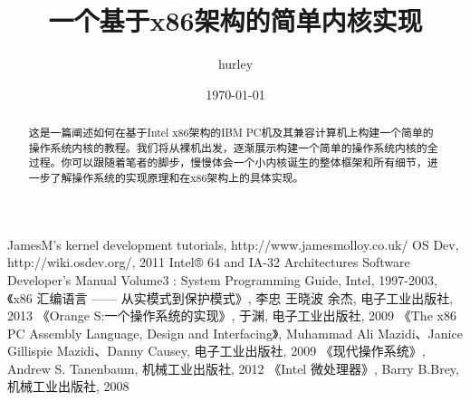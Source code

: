 \documentclass[11pt, a4paper]{article}
\title{一个基于x86架构的简单内核实现}
\author{hurley}
\date{\today}
\begin{document}
\maketitle

\begin{abstract}
这是一篇阐述如何在基于Intel x86架构的IBM PC机及其兼容计算机上构建一个简单的操作系统内核的教程。我们将从裸机出发，逐渐展示构建一个简单的操作系统内核的全过程。你可以跟随着笔者的脚步，慢慢体会一个小内核诞生的整体框架和所有细节，进一步了解操作系统的实现原理和在x86架构上的具体实现。
\end{abstract}

\clearpage

\tableofcontents















\begin{thebibliography}{99}
	 {JamesM's kernel development tutorials}, {http://www.jamesmolloy.co.uk/}
	 {OS Dev}, {http://wiki.osdev.org/}, {2011}
	 {Intel® 64 and IA-32 Architectures Software Developer’s Manual Volume3 : System Programming Guide},
		{Intel}, {1997-2003},
	 {《x86 汇编语言 —— 从实模式到保护模式》}, {李忠 王晓波 余杰},
		 {电子工业出版社}, {2013}
	 {《Orange S:一个操作系统的实现》}, {于渊}, {电子工业出版社}, {2009}
	 {《The x86 PC Assembly Language, Design and Interfacing》},
		{Muhammad Ali Mazidi、Janice Gillispie Mazidi、Danny Causey}, {电子工业出版社}, {2009}
	 {《现代操作系统》}, {Andrew S. Tanenbaum}, {机械工业出版社}, {2012}
	 {《Intel 微处理器》}, {Barry B.Brey}, {机械工业出版社}, {2008}
\end{thebibliography}
\end{document}

